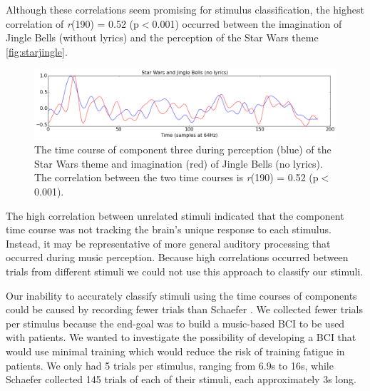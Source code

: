 Although these correlations seem promising for stimulus classification, the highest correlation of \textit{r}(190) = 0.52 (p$<$0.001) occurred between the imagination of Jingle Bells (without lyrics) and the perception of the Star Wars theme \autoref{fig:starjingle}.
\begin{figure}[htbp]
  \centerline{\includegraphics[scale=0.4]{Figures/TimeCourse-StarJingle}}
  \caption{The time course of component three during perception (blue) of the Star Wars theme and imagination (red) of Jingle Bells (no lyrics). The correlation between the two time courses is \textit{r}(190) = 0.52 (p$<$0.001).}
  \label{fig:starjingle}
\end{figure}
The high correlation between unrelated stimuli indicated that the component time course was not tracking the brain's unique response to each stimulus. 
Instead, it may be representative of more general auditory processing that occurred during music perception.
Because high correlations occurred between trials from different stimuli we could not use this approach to classify our stimuli.

Our inability to accurately classify stimuli using the time courses of components could be caused by recording fewer trials than Schaefer \etal \citeyear{schaefer_name_2011}.
We collected fewer trials per stimulus because the end-goal was to build a music-based BCI to be used with patients. 
We wanted to investigate the possibility of developing a BCI that would use minimal training which would reduce the risk of training fatigue in patients.
We only had 5 trials per stimulus, ranging from 6.9s to 16s, while Schaefer \etal \citeyear{schaefer_name_2011} collected 145 trials of each of their stimuli, each approximately 3s long.